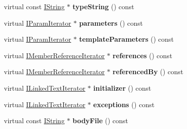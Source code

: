 \begin{DoxyCompactItemize}
\item 
\hypertarget{class_member_handler_ad8188f047f7ef827d179734f929cac2a}{virtual const \hyperlink{class_i_string}{I\-String} $\ast$ {\bfseries type\-String} () const }\label{class_member_handler_ad8188f047f7ef827d179734f929cac2a}

\item 
\hypertarget{class_member_handler_ae4eddfacb5556e94018ed258a2899e33}{virtual \hyperlink{class_i_param_iterator}{I\-Param\-Iterator} $\ast$ {\bfseries parameters} () const }\label{class_member_handler_ae4eddfacb5556e94018ed258a2899e33}

\item 
\hypertarget{class_member_handler_ade1cc5a0e97b9e483b009225b43e1d99}{virtual \hyperlink{class_i_param_iterator}{I\-Param\-Iterator} $\ast$ {\bfseries template\-Parameters} () const }\label{class_member_handler_ade1cc5a0e97b9e483b009225b43e1d99}

\item 
\hypertarget{class_member_handler_a5e004771456ffaf2fe5ca849f3fced68}{virtual \hyperlink{class_i_member_reference_iterator}{I\-Member\-Reference\-Iterator} $\ast$ {\bfseries references} () const }\label{class_member_handler_a5e004771456ffaf2fe5ca849f3fced68}

\item 
\hypertarget{class_member_handler_a6cfe4e69a648ad56fc325ba84bd49b1f}{virtual \hyperlink{class_i_member_reference_iterator}{I\-Member\-Reference\-Iterator} $\ast$ {\bfseries referenced\-By} () const }\label{class_member_handler_a6cfe4e69a648ad56fc325ba84bd49b1f}

\item 
\hypertarget{class_member_handler_ae363c717c243c1dea8edaf3a44400c92}{virtual \hyperlink{class_i_linked_text_iterator}{I\-Linked\-Text\-Iterator} $\ast$ {\bfseries initializer} () const }\label{class_member_handler_ae363c717c243c1dea8edaf3a44400c92}

\item 
\hypertarget{class_member_handler_ad25b9d56776d0b81a6a0ffd2148d7d72}{virtual \hyperlink{class_i_linked_text_iterator}{I\-Linked\-Text\-Iterator} $\ast$ {\bfseries exceptions} () const }\label{class_member_handler_ad25b9d56776d0b81a6a0ffd2148d7d72}

\item 
\hypertarget{class_member_handler_a9ffba18376091558598ac7e08e3c1013}{virtual const \hyperlink{class_i_string}{I\-String} $\ast$ {\bfseries body\-File} () const }\label{class_member_handler_a9ffba18376091558598ac7e08e3c1013}


\end{DoxyCompactItemize}
